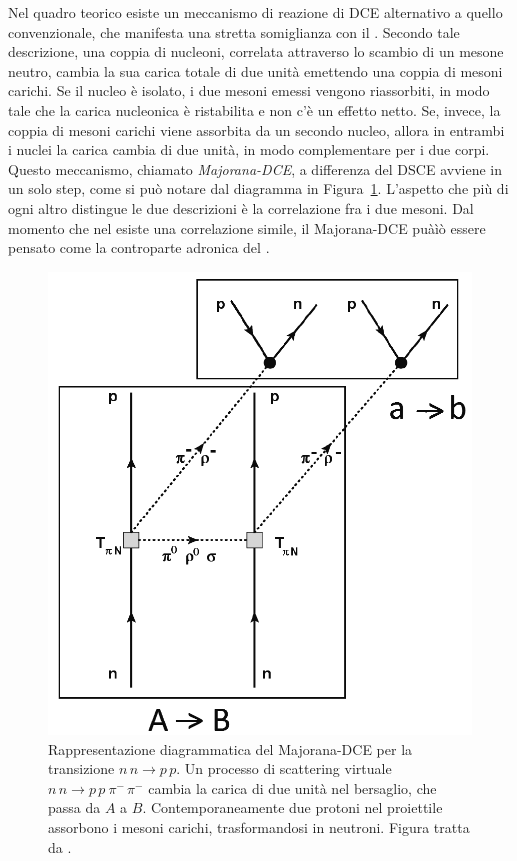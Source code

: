 Nel quadro teorico esiste un meccanismo di reazione di DCE alternativo a quello convenzionale, che manifesta una stretta somiglianza con il \doppiobeta. Secondo tale descrizione, una coppia di nucleoni, correlata attraverso lo scambio di un mesone neutro, cambia la sua carica totale di due unità emettendo una coppia di mesoni carichi. Se il nucleo è isolato, i due mesoni emessi vengono riassorbiti, in modo tale che la carica nucleonica è ristabilita e non c'è un effetto netto. Se, invece, la coppia di mesoni carichi viene assorbita da un secondo nucleo, allora in entrambi i nuclei la carica cambia di due unità, in modo complementare per i due corpi.
Questo meccanismo, chiamato \emph{Majorana-DCE}, a differenza del DSCE avviene in un solo step, come si può notare dal diagramma in Figura~\ref{fig:Majorana-DCE}.
L'aspetto che più di ogni altro distingue le due descrizioni è la correlazione fra i due mesoni. Dal momento che nel \doppiobeta{} esiste una correlazione simile, il Majorana-DCE puàìò essere pensato come la controparte adronica del \doppiobeta.
\begin{figure} [htb]
	\centering
	\includegraphics[scale=0.3]{Grafici/Majorana-DCE.png}
	\caption{Rappresentazione diagrammatica del Majorana-DCE per la transizione $n\, n \rightarrow p\,p$. Un processo di scattering virtuale $n\, n \rightarrow p\,p \: \pi^- \,\pi^-$ cambia la carica di due unità nel bersaglio, che passa da $A$ a $B$. Contemporaneamente due protoni nel proiettile assorbono i mesoni carichi, trasformandosi in neutroni. Figura tratta da \cite{cappuzzello:epja18}.} \label{fig:Majorana-DCE}
\end{figure}